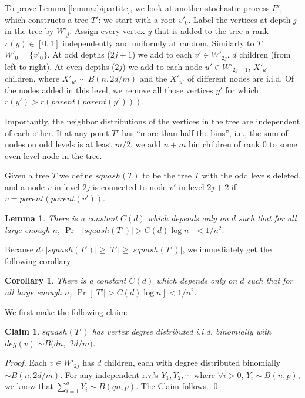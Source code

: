 \documentclass[english, oribibl]{llncs}
\newtheorem{lemma}[theorem]{Lemma}
\newtheorem{corollary}[theorem]{Corollary}
\newtheorem{claim}[theorem]{Claim}
\begin{document}
To prove Lemma \ref{lemma:bipartite}, we look at another stochastic process $F'$, which constructs a tree $T'$:
we start with  a root $v'_0$. Label the vertices at depth $j$ in
the tree by $W'_j$. Assign every vertex $y$ that is added to the tree a rank $r(y) \in [0,1]$ independently and uniformly at random. Similarly to $T$, $W'_0= \{v'_0\}$. At odd depths ($2j+1$) we add to each $v'\in W'_{2j}$, $d$ children (from left to right).  At even depths ($2j$) we add to each node $u' \in W'_{2j-1}$, $X'_{u'}$ children, where $X'_{u'} \sim B(n, 2d/m)$ and the $X'_{u'}$ of different nodes are i.i.d. Of the nodes added in this level, we remove all those vertices $y'$ for which $r(y')>r(parent(parent(y')))$.





Importantly, the neighbor distributions of the vertices in the tree are independent of each other.
If at any point $T'$ has ``more than half the bins'', i.e., the sum of nodes on odd levels is at least $m/2$, we add $n+m$ bin children of rank $0$ to some even-level node in the tree.

Given a tree $T$ we define $squash(T)$ to be the tree $T$ with the
odd levels deleted, and a node $v$ in level $2j$ is connected to node $v'$ in level $2j+2$ if $v=parent(parent(v'))$.


\begin{lemma}
\label{lemma:T'}
There is a constant $C(d)$ which depends only on $d$ such that for all large enough $n$,
$\Pr[|squash(T')|>C(d)\log{n}]<1/n^2.$
\end{lemma}

Because $d\cdot|squash(T')| \geq |T'| \geq |squash(T')|$, we immediately get the following corollary:

\begin{corollary}
\label{corr:T'}
There is a constant $C(d)$ which depends only on $d$ such that for all large enough $n$,
$\Pr[|T'|>C(d)\log{n}]<1/n^2.$
\end{corollary}


We first make the following claim:
\begin{claim}
$squash(T')$  has vertex degree distributed i.i.d. binomially with $deg(v) $ $\sim B(dn,$ $ 2d/m)$.
\end{claim}

\begin{proof}
Each $v \in W'_{2j}$ has $d$ children, each with degree distributed binomially $ \sim B(n, 2d/m)$. 
 For any independent r.v.'s $Y_1, Y_2, \cdots$ where $\forall i>0$, $Y_i \sim B(n,p)$, we know that
 $\displaystyle\sum_{i=1}^q Y_i \sim B(qn,p)$.  The Claim follows. \qed
\end{proof}
\end{document}
